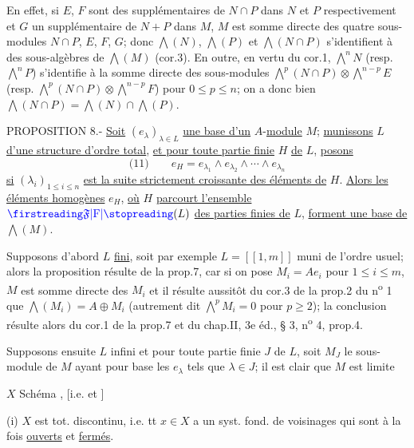 En effet, si $E$, $F$ sont des supplémentaires de $N\cap P$ dans $N$ et $P$ respectivement et $G$ un supplémentaire de $N+P$ dans $M$, $M$ est somme directe des quatre sous-modules $N\cap P$, $E$, $F$, $G$; donc $\bigwedge(N)$, $\bigwedge(P)$ et $\bigwedge(N\cap P)$ s'identifient à des sous-algèbres de $\bigwedge(M)$ (cor.3). En outre, en vertu du cor.1, $\mathop{\bigwedge}\limits^n N$ (resp. $\mathop{\bigwedge}\limits^n P$) s'identifie à la somme directe des sous-modules $\mathop{\bigwedge}\limits^p(N\cap P)\otimes\mathop{\bigwedge}\limits^{n-p}E$ (resp. $\mathop{\bigwedge}\limits^p(N\cap P)\otimes\mathop{\bigwedge}\limits^{n-p}F$) pour $0\leq p\leq n$; on a donc bien $\bigwedge(N\cap P)=\bigwedge(N)\cap\bigwedge(P)$.

PROPOSITION 8.- \uline{Soit} $(e_\lambda)_{\lambda\in L}$ \uline{une base d'un} $A$-\uline{module} $M$; \uline{munissons} $L$ \uline{d'une structure d'ordre total}, \uline{et pour toute partie finie} $H$ \uline{de} $L$, \uline{posons}
\[
\text{(11)}\qquad e_H=e_{\lambda_1}\wedge e_{\lambda_2}\wedge\cdots\wedge e_{\lambda_n}
\]
\uline{si} $(\lambda_i)_{1\leq i\leq n}$ \uline{est la suite strictement croissante des éléments de} $H$. \uline{Alors les éléments homogènes} $e_H$, \uline{où} $H$ \uline{parcourt l'ensemble} $\unsure{\mathfrak F|\mathrm F}(L)$ \uline{des parties finies de} $L$, \uline{forment une base de} $\bigwedge(M)$.

Supposons d'abord $L$ \uline{fini}, soit par exemple $L=[\![1,m]\!]$ muni de l'ordre usuel; alors la proposition résulte de la prop.7, car si on pose $M_i=Ae_i$ pour $1\leq i\leq m$, $M$ est somme directe des $M_i$ et il résulte aussitôt du cor.3 de la prop.2 du n\textsuperscript{o} 1 que $\bigwedge(M_i)=A\oplus M_i$ (autrement dit $\mathop{\bigwedge}\limits^p M_i=0$ pour $p\geq2$); la conclusion résulte alors du cor.1 de la prop.7 et du chap.II, 3e éd., § 3, n\textsuperscript{o} 4, prop.4.

Supposons ensuite $L$ infini et pour toute partie finie $J$ de $L$, soit $M_J$ le sous-module de $M$ ayant pour base les $e_\lambda$ tels que $\lambda\in J$; il est clair que $M$ est limite

$X$ Schéma , [i.e.  et  ]

(i) $X$ est tot. discontinu, 
i.e. tt $x\in X$ a un syst. fond. de voisinages qui sont à la fois \uline{ouverts} et \uline{fermés}.

